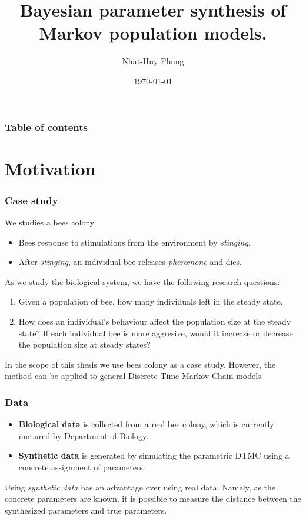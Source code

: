 \documentclass{beamer}
\begin{document}
\title{Bayesian parameter synthesis of  Markov population models.}  
\author{Nhat-Huy Phung}
\date{\today} 

\begin{frame}
  \titlepage
\end{frame}

\begin{frame}
  \frametitle{Table of contents}
  \tableofcontents
\end{frame}

\section{Motivation}
\begin{frame}
  \frametitle{Case study}
  We studies a bees colony
  \begin{itemize}
  \item Bees response to stimulations from the environment by \textit{stinging}.
  \item After \textit{stinging}, an individual bee releases \textit{pheromone}
    and dies.
  \end{itemize}
  As we study the biological system, we have the following research questions:
  \begin{enumerate}
  \item Given a population of bee, how many individuals left in the steady
    state.
  \item How does an individual's behaviour affect the population size at the
    steady state? If each individual bee is more aggresive, would it increase or
    decrease the population size at steady states?
  \end{enumerate}
  In the scope of this thesis we use bees colony as a case study. However, the
  method can be applied to general Discrete-Time Markov Chain models.
\end{frame}

\begin{frame}
  \frametitle{Data}
  \begin{itemize}
  \item \textbf{Biological data} is collected from a real bee colony, which is
    currently nurtured by Department of Biology.
  \item \textbf{Synthetic data} is generated by simulating the parametric DTMC
    using a concrete assignment of parameters.
  \end{itemize}
  Using \textit{synthetic data} has an advantage over using real data. Namely,
  as the concrete parameters are known, it is possible to measure the distance
  between the synthesized parameters and true parameters.
\end{frame}
\end{document}

